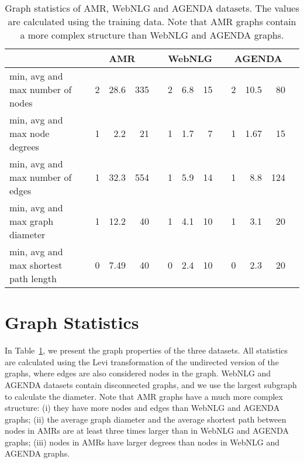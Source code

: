 \documentclass[11pt]{article}
\begin{document}
\begin{table}[t]
\begin{table*}[t]
\centering
{\renewcommand{\arraystretch}{0.8}
\begin{tabular}{lp{0.2cm}rrrp{0.2cm}rrrp{0.2cm}rrrp{0.2cm}}  
\toprule
& & \multicolumn{3}{c}{\textbf{AMR}} & & \multicolumn{3}{c}{\textbf{WebNLG}} & & \multicolumn{3}{c}{\textbf{AGENDA}} \\
\midrule
min, avg and max number of nodes & & 2 & 28.6 & 335 &  & 2 & 6.8 & 15 & & 2 & 10.5 & 80 \\
min, avg and max node degrees & & 1 & 2.2 & 21 & & 1 & 1.7 & 7 & & 1 & 1.67 & 15 \\
min, avg and max number of edges & & 1 & 32.3 & 554 & & 1 & 5.9 & 14 & & 1 & 8.8 & 124 \\
min, avg and max graph diameter & & 1 & 12.2 & 40 & & 1 & 4.1 & 10 & & 1 & 3.1 & 20\\
min, avg and max shortest path length & & 0 & 7.49 & 40 & & 0 & 2.4 & 10 & & 0 & 2.3 & 20\\
\bottomrule
\end{tabular}}
\caption{Graph statistics of AMR, WebNLG and AGENDA datasets. The values are calculated using the training data. Note that AMR graphs contain a more complex structure than WebNLG and AGENDA graphs.}
\label{tab:graphstats}
\end{table*}



\section{Graph Statistics}
\label{sec:graphstats}


In Table~\ref{tab:graphstats}, we present the graph properties of the three datasets. All statistics are calculated using the Levi transformation \cite{beck-etal-2018-acl2018} of the undirected version of the graphs, where edges are also considered nodes in the graph. WebNLG and AGENDA datasets contain disconnected graphs, and we use the largest subgraph to calculate the diameter. Note that AMR graphs have a much more complex structure: (i) they have more nodes and edges than WebNLG and AGENDA graphs; (ii) the average graph diameter and the average shortest path between nodes in AMRs are at least three times larger than in WebNLG and AGENDA graphs; (iii) nodes in AMRs have larger degrees than nodes in WebNLG and AGENDA graphs.

\vspace{15mm}


\end{table}
\end{document}
